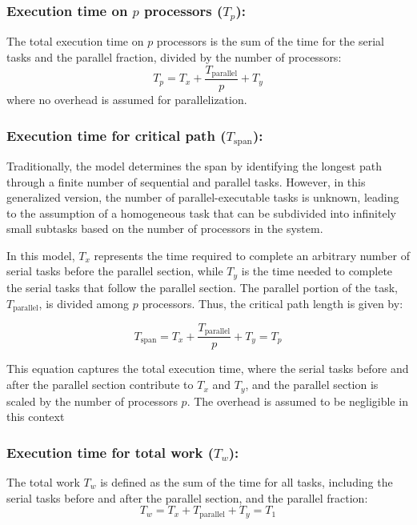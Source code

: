 \documentclass[
  a4paper, %
]{kaohandt}
\begin{document}
\subsubsection*{Execution time on $p$ processors ($T_p$):}

The total execution time on $p$ processors is the sum of the time for the serial tasks and the parallel fraction, divided by the number of processors:
\begin{equation}
  T_p = T_x + \frac{T_{\text{parallel}}}{p} + T_y
\end{equation}
where no overhead is assumed for parallelization.

\subsubsection*{Execution time for critical path ($T_{\text{span}}$):}
Traditionally, the model determines the span by identifying the longest path through a finite number of sequential and parallel tasks. However, in this generalized version, the number of parallel-executable tasks is unknown, leading to the assumption of a homogeneous task that can be subdivided into infinitely small subtasks based on the number of processors in the system.

In this model, $T_x$ represents the time required to complete an arbitrary number of serial tasks before the parallel section, while $T_y$ is the time needed to complete the serial tasks that follow the parallel section. The parallel portion of the task, $T_{\text{parallel}}$, is divided among $p$ processors. Thus, the critical path length is given by:

\begin{equation}
  T_{\text{span}} = T_x + \frac{T_{\text{parallel}}}{p} + T_y = T_p
\end{equation}

This equation captures the total execution time, where the serial tasks before and after the parallel section contribute to $T_x$ and $T_y$, and the parallel section is scaled by the number of processors $p$. The overhead is assumed to be negligible in this context

\subsubsection*{Execution time for total work ($T_w$):}
The total work $T_w$ is defined as the sum of the time for all tasks, including the serial tasks before and after the parallel section, and the parallel fraction:
\begin{equation}
  T_w = T_x + T_{\text{parallel}} + T_y = T_1
\end{equation}
\end{document}
